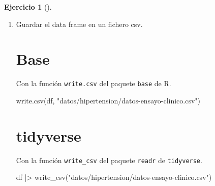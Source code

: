 \documentclass[
  spanish,
  a4paper,
]{scrreport}
\newenvironment{Shaded}{\begin{snugshade}}{\end{snugshade}}
\newcommand{\FunctionTok}[1]{\textcolor[rgb]{0.28,0.35,0.67}{#1}}
\newcommand{\NormalTok}[1]{\textcolor[rgb]{0.00,0.23,0.31}{#1}}
\newcommand{\SpecialCharTok}[1]{\textcolor[rgb]{0.37,0.37,0.37}{#1}}
\newcommand{\StringTok}[1]{\textcolor[rgb]{0.13,0.47,0.30}{#1}}
\theoremstyle{definition}
\newtheorem{exercise}{Ejercicio}[chapter]
\theoremstyle{remark}
\begin{document}
\begin{exercise}[]
\begin{enumerate}
\begin{tcolorbox}
\begin{verbatim}
# A tibble: 6 x 6
  PAD_INI PAD_FIN EVOL_PAD PAS_INI PAS_FIN EVOL_PAS
    <dbl>   <dbl>    <dbl>   <dbl>   <dbl>    <dbl>
1      78     104       26     176     175       -1
2      95     114       19     162     160       -2
3      93     102        9     141     150        9
4      86      91        5     162     161       -1
5      89      94        5     165     162       -3
6      74      99       25     141     148        7
\end{verbatim}

  \end{tcolorbox}
\item
  Guardar el data frame en un fichero csv.

  \begin{tcolorbox}[enhanced jigsaw, titlerule=0mm, arc=.35mm, rightrule=.15mm, opacitybacktitle=0.6, leftrule=.75mm, colframe=quarto-callout-tip-color-frame, toptitle=1mm, breakable, colbacktitle=quarto-callout-tip-color!10!white, bottomrule=.15mm, colback=white, left=2mm, bottomtitle=1mm, opacityback=0, title=\textcolor{quarto-callout-tip-color}{\faLightbulb}\hspace{0.5em}{Solución}, toprule=.15mm, coltitle=black]

  \section{Base}

  Con la función \texttt{write.csv} del paquete \texttt{base} de R.

\begin{Shaded}
\begin{Highlighting}[]
\FunctionTok{write.csv}\NormalTok{(df, }\StringTok{"datos/hipertension/datos{-}ensayo{-}clinico.csv"}\NormalTok{)}
\end{Highlighting}
\end{Shaded}

  \section{tidyverse}

  Con la función \texttt{write\_csv} del paquete \texttt{readr} de
  \texttt{tidyverse}.

\begin{Shaded}
\begin{Highlighting}[]
\NormalTok{df  }\SpecialCharTok{|\textgreater{}} \FunctionTok{write\_csv}\NormalTok{(}\StringTok{"datos/hipertension/datos{-}ensayo{-}clinico.csv"}\NormalTok{)}
\end{Highlighting}
\end{Shaded}

  \end{tcolorbox}
\end{enumerate}

\end{exercise}
\end{document}
